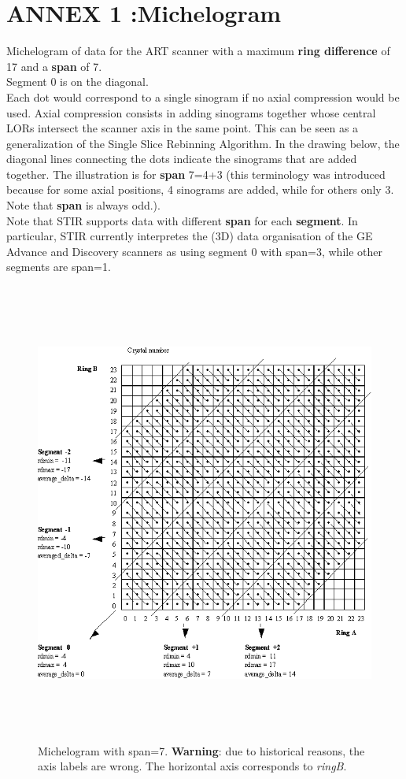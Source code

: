 \documentclass{article}
\begin{document}
\newpage
 \section*{ ANNEX 1 :Michelogram}

Michelogram of data for the ART scanner with a maximum \textbf{ring 
difference} of 17 and a \textbf{span} of 7. \\
Segment 0 is on the diagonal. \\
Each dot would correspond to a single sinogram if no axial compression 
would be used. Axial compression consists in adding sinograms 
together whose central LORs intersect the scanner axis 
in the same point. This can be seen as a generalization of the 
Single Slice Rebinning Algorithm. In the drawing below, the diagonal 
lines connecting the dots indicate the sinograms that are added 
together. The illustration is for \textbf{span} 7=4+3 (this terminology 
was introduced because for some axial positions, 4 sinograms 
are added, while for others only 3. Note that \textbf{span} is always 
odd.).\\
Note that STIR supports data with different \textbf{span} for each \textbf{segment}. 
In particular, STIR currently interpretes the (3D) data organisation of the
GE Advance and Discovery scanners as using segment 0 with span=3, while 
other segments are span=1.

\begin{figure}[htbp]
\begin{center}
\includegraphics[width=6.in, height=6in]{graphics/STIR-glossaryFig1}
\caption{Michelogram with span=7. \textbf{Warning}: due to historical 
reasons, the axis labels are wrong. The horizontal axis corresponds to
\textit{ringB}.}
\end{center}
\end{figure}
\end{document}
